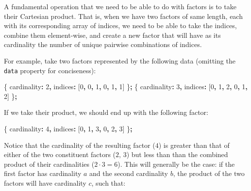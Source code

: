 \documentclass[
]{book}
\newenvironment{Shaded}{\begin{snugshade}}{\end{snugshade}}
\newcommand{\DecValTok}[1]{\textcolor[rgb]{0.00,0.00,0.81}{#1}}
\newcommand{\NormalTok}[1]{#1}
\newcommand{\OperatorTok}[1]{\textcolor[rgb]{0.81,0.36,0.00}{\textbf{#1}}}
\theoremstyle{definition}
\theoremstyle{definition}
\theoremstyle{definition}
\theoremstyle{definition}
\theoremstyle{remark}
\begin{document}
A fundamental operation that we need to be able to do with factors is to take their Cartesian product. That is, when we have two factors of same length, each with its corresponding array of indices, we need to be able to take the indices, combine them element-wise, and create a new factor that will have as its cardinality the number of unique pairwise combinations of indices.

For example, take two factors represented by the following data (omitting the \texttt{data} property for conciseness):

\begin{Shaded}
\begin{Highlighting}[]
\NormalTok{\{ cardinality}\OperatorTok{:} \DecValTok{2}\OperatorTok{,}\NormalTok{ indices}\OperatorTok{:}\NormalTok{ [}\DecValTok{0}\OperatorTok{,} \DecValTok{0}\OperatorTok{,} \DecValTok{1}\OperatorTok{,} \DecValTok{0}\OperatorTok{,} \DecValTok{1}\OperatorTok{,} \DecValTok{1}\NormalTok{] \}}\OperatorTok{;}
\NormalTok{\{ cardinality}\OperatorTok{:} \DecValTok{3}\OperatorTok{,}\NormalTok{ indices}\OperatorTok{:}\NormalTok{ [}\DecValTok{0}\OperatorTok{,} \DecValTok{1}\OperatorTok{,} \DecValTok{2}\OperatorTok{,} \DecValTok{0}\OperatorTok{,} \DecValTok{1}\OperatorTok{,} \DecValTok{2}\NormalTok{] \}}\OperatorTok{;}
\end{Highlighting}
\end{Shaded}

If we take their product, we should end up with the following factor:

\begin{Shaded}
\begin{Highlighting}[]
\NormalTok{\{ cardinality}\OperatorTok{:} \DecValTok{4}\OperatorTok{,}\NormalTok{ indices}\OperatorTok{:}\NormalTok{ [}\DecValTok{0}\OperatorTok{,} \DecValTok{1}\OperatorTok{,} \DecValTok{3}\OperatorTok{,} \DecValTok{0}\OperatorTok{,} \DecValTok{2}\OperatorTok{,} \DecValTok{3}\NormalTok{] \}}\OperatorTok{;}
\end{Highlighting}
\end{Shaded}

Notice that the cardinality of the resulting factor (\(4\)) is greater than that of either of the two constituent factors (\(2\), \(3\)) but less than than the combined product of their cardinalities (\(2 \cdot 3 = 6\)). This will generally be the case: if the first factor has cardinality \(a\) and the second cardinality \(b\), the product of the two factors will have cardinality \(c\), such that:
\end{document}
